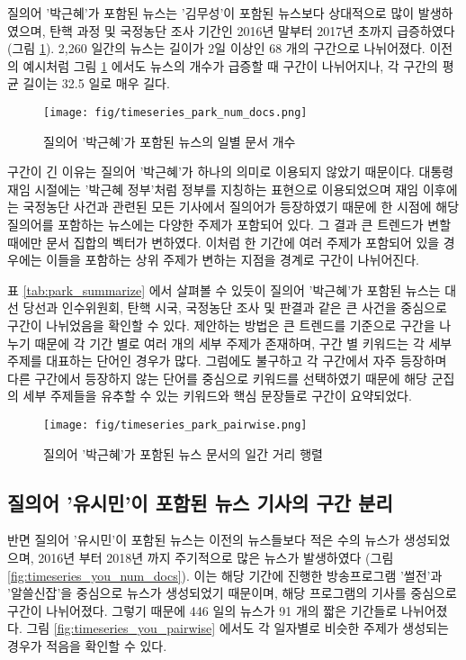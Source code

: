 \documentclass[oneside, ko,phd]{snuthesis_utf8_kor}
\begin{document}
질의어 '박근혜'가 포함된 뉴스는 '김무성'이 포함된 뉴스보다 상대적으로 많이 발생하였으며, 탄핵 과정 및 국정농단 조사 기간인 2016년 말부터 2017년 초까지 급증하였다 (그림 \ref{fig:timeseries_park_num_docs}).
2,260 일간의 뉴스는 길이가 2일 이상인 68 개의 구간으로 나뉘어졌다.
이전의 예시처럼 그림 \ref{fig:timeseries_park_num_docs} 에서도 뉴스의 개수가 급증할 때 구간이 나뉘어지나, 각 구간의 평균 길이는 32.5 일로 매우 길다.

\begin{figure}[H]
\centering
\texttt{[image: fig/timeseries\_park\_num\_docs.png]}
\caption{질의어 '박근혜'가 포함된 뉴스의 일별 문서 개수}
\label{fig:timeseries_park_num_docs}
\end{figure}

구간이 긴 이유는 질의어 '박근혜'가 하나의 의미로 이용되지 않았기 때문이다.
대통령 재임 시절에는 '박근혜 정부'처럼 정부를 지칭하는 표현으로 이용되었으며 재임 이후에는 국정농단 사건과 관련된 모든 기사에서 질의어가 등장하였기 때문에 한 시점에 해당 질의어를 포함하는 뉴스에는 다양한 주제가 포함되어 있다.
그 결과 큰 트렌드가 변할 때에만 문서 집합의 벡터가 변하였다.
이처럼 한 기간에 여러 주제가 포함되어 있을 경우에는 이들을 포함하는 상위 주제가 변하는 지점을 경계로 구간이 나뉘어진다.

표 \ref{tab:park_summarize} 에서 살펴볼 수 있듯이 질의어 '박근혜'가 포함된 뉴스는 대선 당선과 인수위원회, 탄핵 시국, 국정농단 조사 및 판결과 같은 큰 사건을 중심으로 구간이 나뉘었음을 확인할 수 있다.
제안하는 방법은 큰 트렌드를 기준으로 구간을 나누기 때문에 각 기간 별로 여러 개의 세부 주제가 존재하며, 구간 별 키워드는 각 세부 주제를 대표하는 단어인 경우가 많다.
그럼에도 불구하고 각 구간에서 자주 등장하며 다른 구간에서 등장하지 않는 단어를 중심으로 키워드를 선택하였기 때문에 해당 군집의 세부 주제들을 유추할 수 있는 키워드와 핵심 문장들로 구간이 요약되었다.

\begin{figure}[H]
\centering
\texttt{[image: fig/timeseries\_park\_pairwise.png]}
\caption{질의어 '박근혜'가 포함된 뉴스 문서의 일간 거리 행렬}
\label{fig:timeseries_park_pairwise}
\end{figure}

\subsection{질의어 '유시민'이 포함된 뉴스 기사의 구간 분리}

반면 질의어 '유시민'이 포함된 뉴스는 이전의 뉴스들보다 적은 수의 뉴스가 생성되었으며, 2016년 부터 2018년 까지 주기적으로 많은 뉴스가 발생하였다 (그림 \ref{fig:timeseries_you_num_docs}).
이는 해당 기간에 진행한 방송프로그램 '썰전'과 '알쓸신잡'을 중심으로 뉴스가 생성되었기 때문이며, 해당 프로그램의 기사를 중심으로 구간이 나뉘어졌다.
그렇기 때문에 446 일의 뉴스가 91 개의 짧은 기간들로 나뉘어졌다.
그림 \ref{fig:timeseries_you_pairwise} 에서도 각 일자별로 비슷한 주제가 생성되는 경우가 적음을 확인할 수 있다.
\end{document}
